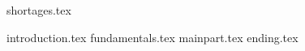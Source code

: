 \documentclass[runningheads]{llncs}
\begin{document}

\newpage

{shortages.tex}

\newpage

{introduction.tex}
{fundamentals.tex}
{mainpart.tex}
{ending.tex}


\newpage

\printbibliography

\end{document}
